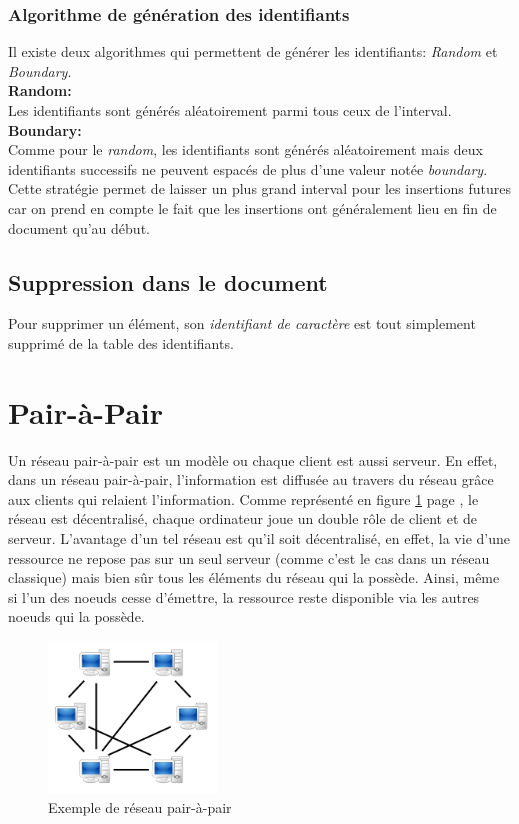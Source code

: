		\subsubsection{Algorithme de génération des
		identifiants}\label{sec:algos}
		Il existe deux algorithmes qui permettent de générer les identifiants:
		\emph{Random} et \emph{Boundary}.\\
		
		\textbf{Random:}\\
			Les identifiants sont générés aléatoirement parmi tous ceux de
			l'interval.\\
		
		\textbf{Boundary:}\\
			Comme pour le \emph{random}, les identifiants sont générés
			aléatoirement mais deux identifiants successifs ne peuvent espacés
			de plus d'une valeur notée \emph{boundary}. Cette stratégie permet
			de laisser un plus grand interval pour les insertions futures car on
			prend en compte le fait que les insertions ont généralement lieu en
			fin de document qu'au début.
		
	\subsection{Suppression dans le document}
		
		Pour supprimer un élément, son \emph{identifiant de caractère} est tout
		simplement supprimé de la table des identifiants.
		
\section{Pair-à-Pair}\label{sec:p2p}

	Un réseau pair-à-pair est un modèle ou chaque client est aussi serveur. En
	effet, dans un réseau pair-à-pair, l'information est diffusée au travers du
	réseau grâce aux clients qui relaient l'information. Comme représenté en
	figure \ref{fig:p2p} page \pageref{fig:p2p}, le réseau est décentralisé,
	chaque ordinateur joue un double rôle de client et de serveur. L'avantage
	d'un tel réseau est qu'il soit décentralisé, en effet, la vie d'une
	ressource ne repose pas sur un seul serveur (comme c'est le cas dans un
	réseau classique) mais bien sûr tous les éléments du réseau qui la possède.
	Ainsi, même si l'un des noeuds cesse d'émettre, la ressource reste
	disponible via les autres noeuds qui la possède.
	
	\begin{figure}
	  \center
      \includegraphics[width=0.4\textwidth]{includes/P2P-network.png}
      \caption{Exemple de réseau pair-à-pair}
      \label{fig:p2p}
    \end{figure}
	
